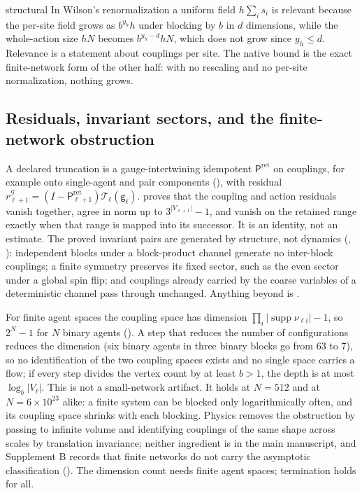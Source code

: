 \begin{analogy}{structural}
In Wilson's renormalization a uniform field $h\sum_is_i$ is relevant because the per-site field grows
as $b^{y_h}h$ under blocking by $b$ in $d$ dimensions, while the whole-action size $hN$ becomes
$b^{y_h-d}hN$, which does not grow since $y_h\le d$. Relevance is a statement about couplings per
site. The native bound is the exact finite-network form of the other half: with no rescaling and no
per-site normalization, nothing grows.
\end{analogy}

\subsection{Residuals, invariant sectors, and the finite-network obstruction}

A declared truncation is a gauge-intertwining idempotent $\mathsf P^{\mathrm{ret}}$ on couplings, for
example onto single-agent and pair components (), with residual
$r^{\mathcal G}_{\ell+1}=(I-\mathsf P^{\mathrm{ret}}_{\ell+1})\mathcal T_\ell(\mathsf g_\ell)$.
 proves that the coupling and action residuals vanish together, agree
in norm up to $3^{\lvert V_{\ell+1}\rvert}-1$, and vanish on the retained range exactly when that range
is mapped into its successor. It is an identity, not an estimate. The proved invariant pairs are
generated by structure, not dynamics (,
): independent blocks under a block-product channel generate no
inter-block couplings; a finite symmetry preserves its fixed sector, such as the even sector under a
global spin flip; and couplings already carried by the coarse variables of a deterministic channel
pass through unchanged. Anything beyond is .

For finite agent spaces the coupling space has dimension $\prod_i\lvert\operatorname{supp}\nu_{\ell
i}\rvert-1$, so $2^N-1$ for $N$ binary agents (). A
step that reduces the number of configurations reduces the dimension (six binary agents in three binary
blocks go from $63$ to $7$), so no identification of the two coupling spaces exists and no single space
carries a flow; if every step divides the vertex count by at least $b>1$, the depth is at most
$\log_b\lvert V_\ell\rvert$. This is not a small-network artifact. It holds at $N=512$ and at
$N=6\times10^{23}$ alike: a finite system can be blocked only logarithmically often, and its coupling
space shrinks with each blocking. Physics removes the obstruction by passing to infinite volume and
identifying couplings of the same shape across scales by translation invariance; neither ingredient is
in the main manuscript, and Supplement B records that finite networks do not carry the asymptotic
classification (). The dimension count needs finite agent
spaces; termination holds for all.

